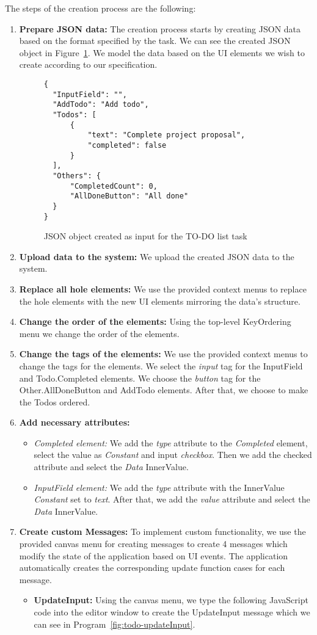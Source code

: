The steps of the creation process are the following:
\begin{enumerate}
\item \textbf{Prepare JSON data:} The creation process starts by creating JSON data based on the format specified by the task.
We can see the created JSON object in Figure~\ref{fig:todo-json}.
We model the data based on the UI elements we wish to create according to our specification.
\begin{figure}[htbp]
	\caption{JSON object created as input for the TO-DO list task}
	\label{fig:todo-json}
	\begin{lstlisting}
{
  "InputField": "",
  "AddTodo": "Add todo",
  "Todos": [
      {
          "text": "Complete project proposal",
          "completed": false
      }
  ],
  "Others": {
      "CompletedCount": 0,
      "AllDoneButton": "All done"
  }
}
    \end{lstlisting}
\end{figure}


\item \textbf{Upload data to the system:} We upload the created JSON data to the system.
\item \textbf{Replace all hole elements:} We use the provided context menus to replace the hole elements with the new UI elements mirroring the data's structure.
\item \textbf{Change the order of the elements:} Using the top-level KeyOrdering menu we change the order of the elements.
\item \textbf{Change the tags of the elements:} We use the provided context menus to change the tags for the elements.
We select the \emph{input} tag for the InputField and Todo.Completed elements. We choose the \emph{button} tag for the Other.AllDoneButton and AddTodo elements.
After that, we choose to make the Todos ordered.
\item \textbf{Add necessary attributes:}
\begin{itemize}
	\item \emph{Completed element:} We add the \emph{type} attribute to the \emph{Completed} element, select the value as \emph{Constant} and input \emph{checkbox}.
	      Then we add the checked attribute and select the \emph{Data} InnerValue.
	\item \emph{InputField element:} We add the \emph{type} attribute with the InnerValue \emph{Constant} set to \emph{text}.
	      After that, we add the \emph{value} attribute and select the \emph{Data} InnerValue.
\end{itemize}
\item \textbf{Create custom Messages:} To implement custom functionality, we use the provided canvas menu for creating messages to create 4 messages which modify the state of the application based on UI events.
The application automatically creates the corresponding update function cases for each message.
\begin{itemize}
\item \textbf{UpdateInput:}  Using the canvas menu, we type the following JavaScript code into the editor window to create the UpdateInput message which we can see in Program~\ref{fig:todo-updateInput}.


\end{itemize}
\end{enumerate}
